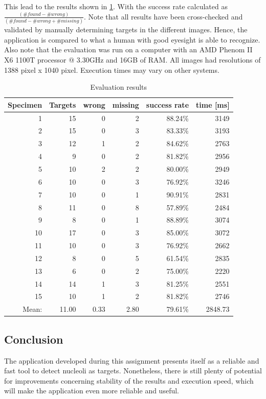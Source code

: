 \documentclass[a4paper, 12pt]{article}
\begin{document}
This lead to the results shown in \ref{tab:evaluation}. With the success rate
calculated as $\frac{(\#found - \#wrong)}{(\#found - \#wrong + \#missing)}$.
Note that all results have been cross-checked and validated by manually
determining targets in the different images. Hence, the application is compared
to what a human with good eyesight is able to recognize. Also note that the
evaluation was run on a computer with an AMD Phenom II X6 1100T processor @
3.30GHz and 16GB of RAM. All images had resolutions of 1388 pixel x 1040
pixel. Execution times may vary on other systems.

\begin{table}[h]
\centering
\begin{tabular} {r | r | r | r | r | r}
Specimen & Targets & wrong & missing & success rate & time [ms]\\
\hline
1 & 15 & 0 & 2 & 88.24\% & 3149\\
2 & 15 & 0 & 3 & 83.33\% & 3193\\
3 & 12 & 1 & 2 & 84.62\% & 2763\\
4 & 9 & 0 & 2 & 81.82\% & 2956\\
5 & 10 & 2 & 2 & 80.00\% & 2949\\
6 & 10 & 0 & 3 & 76.92\% & 3246\\
7 & 10 & 0 & 1 & 90.91\% & 2831\\
8 & 11 & 0 & 8 & 57.89\% & 2484\\
9 & 8 & 0 & 1 & 88.89\% & 3074\\
10 & 17 & 0 & 3 & 85.00\% & 3072\\
11 & 10 & 0 & 3 & 76.92\% & 2662\\
12 & 8 & 0 & 5 & 61.54\% & 2835\\
13 & 6 & 0 & 2 & 75.00\% & 2220\\
14 & 14 & 1 & 3 & 81.25\% & 2551\\
15 & 10 & 1 & 2 & 81.82\% & 2746\\
\hline
Mean: & 11.00 & 0.33 & 2.80 & 79.61\% & 2848.73\\
\end{tabular}
\caption{Evaluation results}
\label{tab:evaluation}
\end{table}

\subsection{Conclusion}
The application developed during this assignment presents itself as a reliable
and fast tool to detect nucleoli as targets. Nonetheless, there is still plenty
of potential for improvements concerning stability of the results and execution
speed, which will make the application even more reliable and useful.
\end{document}

